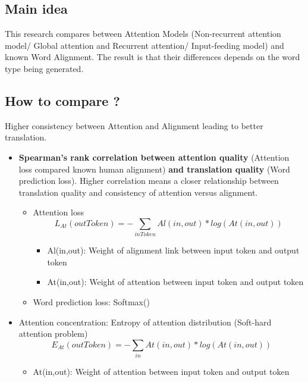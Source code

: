 \documentclass{article}
\begin{document}
\subsection{Main idea}
This research compares between Attention Models (Non-recurrent attention model/ Global attention and Recurrent attention/ Input-feeding model) and known Word Alignment.
The result is that their differences depends on the word type being generated.
\subsection{How to compare ?}
Higher consistency between Attention and Alignment leading to better translation.

\begin{itemize}
\item \textbf{Spearman's rank correlation between attention quality} (Attention loss compared known human alignment) \textbf{and translation quality} (Word prediction loss).
Higher correlation means a closer relationship between translation quality and consistency of attention versus alignment.
	\begin{itemize}
	\item Attention loss
		\begin{equation}
		L_{At}(outToken) = - \sum_{inToken} Al(in, out) * log(At(in, out))
		\end{equation}
		\begin{itemize}
		\item Al(in,out): Weight of alignment link between input token and output token
		\item At(in,out): Weight of attention between input token and output token
		\end{itemize}

	\item Word prediction loss: Softmax()
	\end{itemize}
	
\item Attention concentration: Entropy of attention distribution (Soft-hard attention problem)
	\begin{equation}
	E_{At}(outToken) = - \sum_{in} At(in, out) * log (At(in, out))
	\end{equation}
	\begin{itemize}
	\item At(in,out): Weight of attention between input token and output token
	\end{itemize}
\end{itemize}
\end{document}

